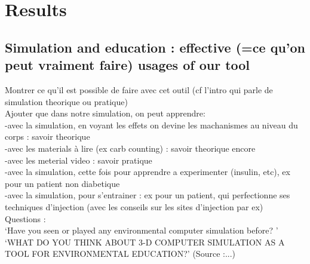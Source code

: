 
\section{Results}

\subsection{Simulation and education : effective (=ce qu'on peut vraiment faire) usages of our tool}
\label{sec:simulationUsages}
Montrer ce qu'il est possible de faire avec cet outil (cf l'intro qui parle de simulation theorique ou pratique)\\
Ajouter que dans notre simulation, on peut apprendre:\\
-avec la simulation, en voyant les effets on devine les machanismes au niveau du corps : savoir theorique\\
-avec les materials à lire (ex carb counting) : savoir theorique encore\\
-avec les meterial video : savoir pratique\\
-avec la simulation, cette fois pour apprendre a experimenter (insulin, etc), ex pour un patient non diabetique\\
-avec la simulation, pour s'entrainer : ex pour un patient, qui perfectionne ses techniques d'injection (avec les conseils sur les sites d'injection par ex)\\

Questions :\\
`Have you seen or played any environmental computer simulation before? '
`WHAT DO YOU THINK ABOUT 3-D COMPUTER SIMULATION AS A TOOL FOR ENVIRONMENTAL EDUCATION?'
(Source :...)%

\cite{pmid17316094} %

